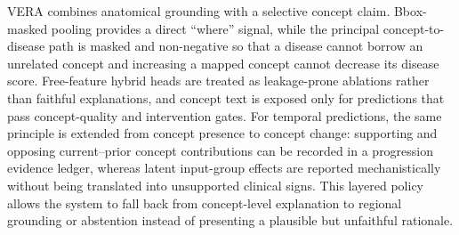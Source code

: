 \documentclass[preprint,12pt]{elsarticle}
\begin{document}
VERA combines anatomical grounding with a selective concept claim. Bbox-masked
pooling provides a direct ``where'' signal, while the principal concept-to-disease
path is masked and non-negative so that a disease cannot borrow an unrelated
concept and increasing a mapped concept cannot decrease its disease score.
Free-feature hybrid heads are treated as leakage-prone ablations rather than
faithful explanations, and concept text is exposed only for predictions that pass
concept-quality and intervention gates. For temporal predictions, the same
principle is extended from concept presence to concept change: supporting and
opposing current--prior concept contributions can be recorded in a progression
evidence ledger, whereas latent input-group effects are reported mechanistically
without being translated into unsupported clinical signs. This layered policy
allows the system to fall back from concept-level explanation to regional
grounding or abstention instead of presenting a plausible but unfaithful
rationale.
\end{document}
